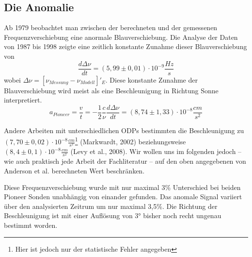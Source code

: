 \documentclass[a4paper,10pt]{article}
\newcommand{\rem}[1]{}
\begin{document}
\subsection{Die Anomalie}
Ab 1979 beobachtet man zwischen der berechneten und der gemessenen Frequenzverschiebung eine anormale Blauverschiebung.
Die Analyse der Daten von 1987 bis 1998 zeigte eine zeitlich konstante Zunahme dieser Blauverschiebung von
\begin{equation}
  \frac{d\Delta\nu}{dt}=(5,99\pm0,01)\cdot10^{-9}\frac{Hz}{s}
\end{equation}
wobei $\Delta\nu=[\nu_{Messung}-\nu_{Modell}]'_E$. Diese konstante Zunahme der Blauverschiebung wird meist als eine
Beschleunigung in Richtung Sonne interpretiert.
\begin{equation}
  a_{Pioneer}=\frac{v}{t}=-\frac{1}{2}\frac{c}{\nu}\frac{d\Delta\nu}{dt} = (8,74\pm1,33)\cdot10^{-8}\frac{cm}{s^2}
\end{equation}
\rem{
oder
\begin{equation}
  \Delta\nu=-\nu_E \frac{2a_p t}{c}
\end{equation}
}
Andere Arbeiten mit unterschiedlichen ODPs bestimmten die Beschleunigung zu $(7,70
\pm0,02)\cdot10^{-8}\frac{cm}{s^2}$\footnote{Hier ist jedoch nur der statistische Fehler angegeben} (Markwardt,
2002)\cite{Markwardt2002} beziehungsweise $(8,4\pm0,1)\cdot10^{-8}\frac{cm}{s^2}$ (Levy et al., 2008)\cite{Levy2008}.
Wir wollen uns im folgenden jedoch – wie auch praktisch jede Arbeit der Fachliteratur – auf den oben angegebenen von
Anderson et al. berechneten Wert beschränken.

Diese Frequenzverschiebung wurde mit nur maximal 3\% Unterschied bei beiden Pioneer Sonden unabhängig von einander
gefunden. Das anomale Signal variiert über den analysierten Zeitrum um nur maximal 3,5\%. Die Richtung der
Beschleunigung ist mit einer Auflösung von 3° bisher noch recht ungenau bestimmt worden.




{}

\end{document}
